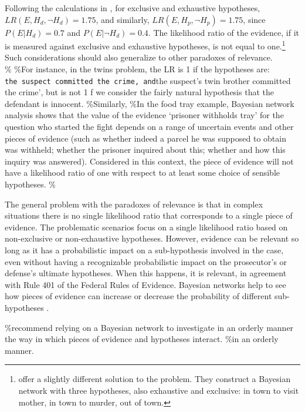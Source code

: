\documentclass[10pt,dvipsnames,enabledeprecatedfontcommands]{scrartcl}
\begin{document}
\noindent
 Following the calculations in
\citep{dezoete2019ResolvingSocalledProbabilistic}, for exclusive and
exhaustive hypotheses, \(LR(E,H_d,\neg H_d)=1.75\), and similarly,
\(LR(E,H_p, \neg H_p)=1.75\), since \(P(E\vert H_d)=0.7\) and
\(P(E\vert \neg H_d)=0.4\). The likelihood ratio of the evidence, if it
is measured against exclusive and exhaustive hypotheses, is not equal to
one.\footnote{ \cite{dezoete2019ResolvingSocalledProbabilistic} offer a slightly different solution to the problem. They construct a Bayesian network with three hypotheses, also exhaustive and exclusive: in town to visit mother, in town to murder, out of town.}
Such considerations should also generalize to other paradoxes of
relevance.\\
\% \%For instance, in the twins problem, the LR is 1 if the hypotheses
are:
\texttt{the\ suspect\ committed\ the\ crime\textquotesingle{},\ and}the
suspect's twin brother committed the crime', but is not 1 f we consider
the fairly natural hypothesis that the defendant is innocent.
\%Similarly, \%In the food tray example, Bayesian network analysis shows
that the value of the evidence `prisoner withholds tray' for the
question who started the fight depends on a range of uncertain events
and other pieces of evidence (such as whether indeed a parcel he was
supposed to obtain was withheld; whether the prisoner inquired about
this; whether and how this inquiry was answered). Considered in this
context, the piece of evidence will not have a likelihood ratio of one
with respect to at least some choice of sensible hypotheses. \%

The general problem with the paradoxes of relevance is that in complex
situations there is no single likelihood ratio that corresponds to a
single piece of evidence. The problematic scenarios focus on a single
likelihood ratio based on non-exclusive or non-exhaustive hypotheses.
However, evidence can be relevant so long as it has a probabilistic
impact on a sub-hypothesis involved in the case, even without having a
recognizable probabilistic impact on the prosecutor's or defense's
ultimate hypotheses. When this happens, it is relevant, in agreement
with Rule 401 of the Federal Rules of Evidence. Bayesian networks help
to see how pieces of evidence can increase or decrease the probability
of different sub-hypotheses
\cite{dezoete2019ResolvingSocalledProbabilistic}.

\%recommend relying on a Bayesian network to investigate in an orderly
manner the way in which pieces of evidence and hypotheses
interact. \%in
an orderly manner.
\end{document}
